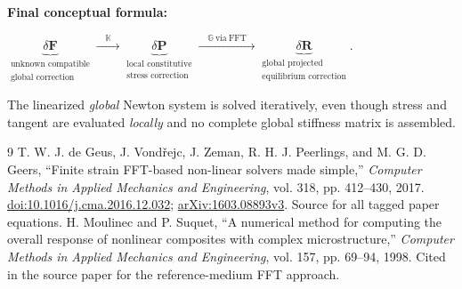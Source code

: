 \documentclass[11pt,a4paper]{article}
\numberwithin{equation}{section}
\newcommand{\F}{\mathbf F}
\newcommand{\Pstress}{\mathbf P}
\newcommand{\Gop}{\mathbb G}
\newcommand{\Kop}{\mathbb K}
\begin{document}
\begin{insight}
\textbf{Final conceptual formula:}\par\medskip
\centering
$\displaystyle
\underbrace{\delta\F}_{\substack{\text{unknown compatible}\\\text{global correction}}}
\xrightarrow{\quad\Kop\quad}
\underbrace{\delta\Pstress}_{\substack{\text{local constitutive}\\\text{stress correction}}}
\xrightarrow{\quad\Gop\ \mathrm{via\ FFT}\quad}
\underbrace{\delta\mathbf R}_{\substack{\text{global projected}\\\text{equilibrium correction}}}.$
\par\medskip
\raggedright
The linearized \emph{global} Newton system is solved iteratively, even though stress and tangent are evaluated \emph{locally} and no complete global stiffness matrix is assembled.
\end{insight}

\begin{thebibliography}{9}
 T. W. J. de Geus, J. Vond\v{r}ejc, J. Zeman, R. H. J. Peerlings, and M. G. D. Geers, ``Finite strain FFT-based non-linear solvers made simple,'' \emph{Computer Methods in Applied Mechanics and Engineering}, vol. 318, pp. 412--430, 2017. \href{https://doi.org/10.1016/j.cma.2016.12.032}{doi:10.1016/j.cma.2016.12.032}; \href{https://arxiv.org/abs/1603.08893}{arXiv:1603.08893v3}. Source for all tagged paper equations.
 H. Moulinec and P. Suquet, ``A numerical method for computing the overall response of nonlinear composites with complex microstructure,'' \emph{Computer Methods in Applied Mechanics and Engineering}, vol. 157, pp. 69--94, 1998. Cited in the source paper for the reference-medium FFT approach.
\end{thebibliography}
\end{document}
